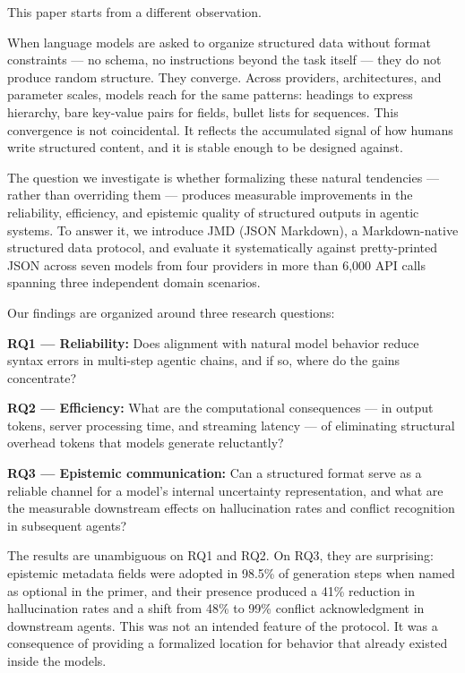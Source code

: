 \documentclass[11pt]{article}
\begin{document}
This paper starts from a different observation.

When language models are asked to organize structured data without format constraints --- no schema, no instructions beyond the task itself --- they do not produce random structure. They converge. Across providers, architectures, and parameter scales, models reach for the same patterns: headings to express hierarchy, bare key-value pairs for fields, bullet lists for sequences. This convergence is not coincidental. It reflects the accumulated signal of how humans write structured content, and it is stable enough to be designed against.

The question we investigate is whether formalizing these natural tendencies --- rather than overriding them --- produces measurable improvements in the reliability, efficiency, and epistemic quality of structured outputs in agentic systems. To answer it, we introduce JMD (JSON Markdown), a Markdown-native structured data protocol, and evaluate it systematically against pretty-printed JSON across seven models from four providers in more than 6,000 API calls spanning three independent domain scenarios.

Our findings are organized around three research questions:

\textbf{RQ1 --- Reliability:} Does alignment with natural model behavior reduce syntax errors in multi-step agentic chains, and if so, where do the gains concentrate?

\textbf{RQ2 --- Efficiency:} What are the computational consequences --- in output tokens, server processing time, and streaming latency --- of eliminating structural overhead tokens that models generate reluctantly?

\textbf{RQ3 --- Epistemic communication:} Can a structured format serve as a reliable channel for a model's internal uncertainty representation, and what are the measurable downstream effects on hallucination rates and conflict recognition in subsequent agents?

The results are unambiguous on RQ1 and RQ2. On RQ3, they are surprising: epistemic metadata fields were adopted in 98.5\% of generation steps when named as optional in the primer, and their presence produced a 41\% reduction in hallucination rates and a shift from 48\% to 99\% conflict acknowledgment in downstream agents. This was not an intended feature of the protocol. It was a consequence of providing a formalized location for behavior that already existed inside the models.
\end{document}
